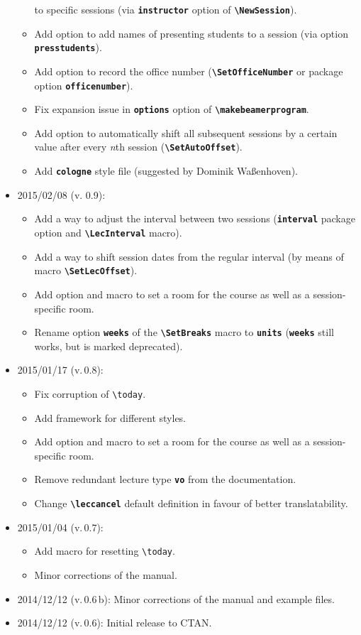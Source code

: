 \documentclass[english]{article}
\newcommand*\jmacro[1]{\textbf{\texttt{#1}}}
\newcommand*\jcsmacro[1]{\jmacro{\textbackslash{#1}}}
\newcommand*\joption[1]{\textbf{\texttt{#1}}}
\newcommand*\jfmacro[1]{\texttt{#1}}
\newcommand*\jfcsmacro[1]{\jfmacro{\textbackslash{#1}}}
\begin{document}
\begin{itemize}
\begin{itemize}
             to specific sessions (via \joption{instructor} option of
             \jcsmacro{NewSession}).
       \item Add option to add names of presenting students to a session (via option
             \joption{presstudents}).
       \item Add option to record the office number (\jcsmacro{SetOfficeNumber}
             or package option \joption{officenumber}).
       \item Fix expansion issue in \joption{options} option of \jcsmacro{makebeamerprogram}.
       \item Add option to automatically shift all subsequent sessions by a certain value
             after every \emph{n}th session (\jcsmacro{SetAutoOffset}).
       \item Add \joption{cologne} style file (suggested by Dominik Waßenhoven).
    \end{itemize}
\item 2015/02/08 (v. 0.9):
     \begin{itemize}
       \item Add a way to adjust the interval between two sessions
             (\joption{interval} package option and \jcsmacro{LecInterval} macro).
       \item Add a way to shift session dates from the regular interval
             (by means of macro \jcsmacro{SetLecOffset}).
       \item Add option and macro to set a room for the course as well as
             a session-specific room.
       \item Rename option \joption{weeks} of the \jcsmacro{SetBreaks} macro
             to \joption{units} (\joption{weeks} still works, but is marked deprecated).
    \end{itemize} 
\item 2015/01/17 (v.\,0.8):
    \begin{itemize}
       \item Fix corruption of \jfcsmacro{today}.
       \item Add framework for different styles.
       \item Add option and macro to set a room for the course as well as
             a session-specific room.
       \item Remove redundant lecture type \joption{vo} from the documentation.
       \item Change \jcsmacro{leccancel} default definition in favour of better
             translatability.
    \end{itemize}\filbreak
\item 2015/01/04 (v.\,0.7):
    \begin{itemize}
       \item Add macro for resetting \jfcsmacro{today}.
       \item Minor corrections of the manual.
    \end{itemize}
\item 2014/12/12 (v.\,0.6\,b): Minor corrections of the manual and example files.
\item 2014/12/12 (v.\,0.6): Initial release to CTAN.
\end{itemize}
\end{document}

